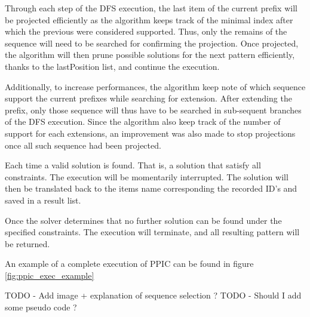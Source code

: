 \documentclass{eplmastersthesis}
\begin{document}
\begin{enumerate}
Through each step of the DFS execution, the last item of the current prefix will be projected efficiently as the algorithm keeps track of the minimal index after which the previous  were considered supported. Thus, only the remains of the sequence will need to be searched for confirming the projection. Once projected, the algorithm will then prune possible solutions for the next pattern efficiently, thanks to the lastPosition list, and continue the execution. 

Additionally, to increase performances, the algorithm keep note of which sequence support the current prefixes while searching for extension. After extending the prefix, only those sequence will thus have to be searched in sub-sequent branches of the DFS execution. Since the algorithm also keep track of the number of support for each extensions, an improvement was also made to stop projections once all such sequence had been projected. \newline

Each time a valid solution is found. That is, a solution that satisfy all constraints. The execution will be momentarily interrupted. The solution will then be translated back to the items name corresponding the recorded ID's and saved in a result list. \newline

Once the solver determines that no further solution can be found under the specified constraints. The execution will terminate, and all resulting pattern will be returned.
\end{enumerate}

An example of a complete execution of PPIC can be found in figure \ref{fig:ppic_exec_example} \newline

TODO - Add image  + explanation of sequence selection ?
TODO - Should I add some pseudo code ?
\end{document}
